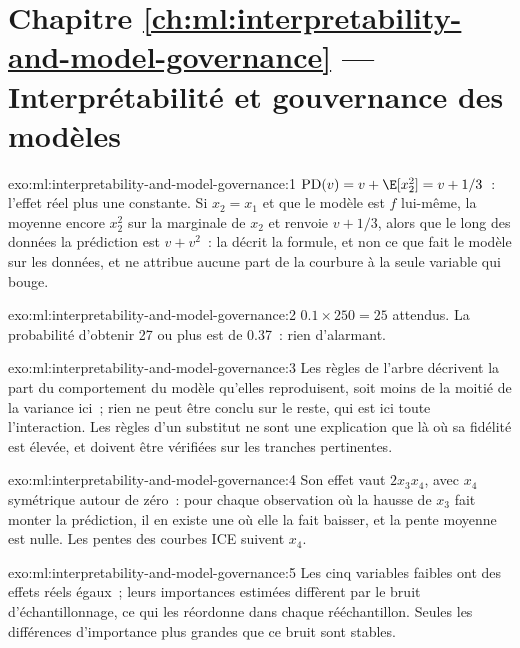 \section*{Chapitre \ref{ch:ml:interpretability-and-model-governance} --- Interprétabilité et gouvernance des modèles}

\begin{solution}{exo:ml:interpretability-and-model-governance:1}
$\mathrm{PD}(v) = v + \E[x_2^2] = v + 1/3$~: l'effet réel plus une constante. Si $x_2 = x_1$ et que le modèle est $f$ lui-même,
la  moyenne encore $x_2^2$ sur la marginale de $x_2$ et renvoie $v + 1/3$, alors que le long des données la
prédiction est $v + v^2$~: la  décrit la formule, et non ce que fait le modèle sur les données, et ne
attribue aucune part de la courbure à la seule variable qui bouge.
\end{solution}

\begin{solution}{exo:ml:interpretability-and-model-governance:2}
$0.1\times250 = 25$ attendus. La probabilité d'obtenir 27 ou plus est de 0.37~: rien d'alarmant.
\end{solution}

\begin{solution}{exo:ml:interpretability-and-model-governance:3}
Les règles de l'arbre décrivent la part du comportement du modèle qu'elles reproduisent, soit moins de la moitié de la variance ici~; rien ne peut être
conclu sur le reste, qui est ici toute l'interaction. Les règles d'un substitut ne sont une explication que là où sa fidélité
est élevée, et doivent être vérifiées sur les tranches pertinentes.
\end{solution}

\begin{solution}{exo:ml:interpretability-and-model-governance:4}
Son effet vaut $2x_3x_4$, avec $x_4$ symétrique autour de zéro~: pour chaque observation où la hausse de $x_3$ fait monter la prédiction, il
en existe une où elle la fait baisser, et la pente moyenne est nulle. Les pentes des courbes ICE suivent $x_4$.
\end{solution}

\begin{solution}{exo:ml:interpretability-and-model-governance:5}
Les cinq variables faibles ont des effets réels égaux~; leurs importances estimées diffèrent par le bruit d'échantillonnage, ce qui les réordonne dans
chaque rééchantillon. Seules les différences d'importance plus grandes que ce bruit sont stables.
\end{solution}

